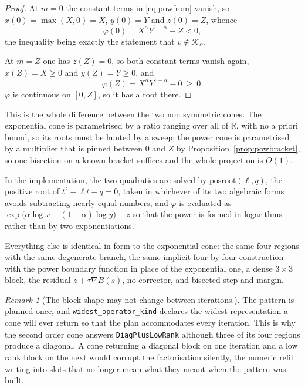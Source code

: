 \documentclass[a4paper,11pt]{book}
\theoremstyle{plain}
\theoremstyle{definition}
\theoremstyle{remark}
\newtheorem{remark}[theorem]{Remark}
\numberwithin{equation}{chapter}
\numberwithin{algorithm}{chapter}
\newcommand{\R}{\mathbb{R}}
\newcommand{\Kpow}{\mathcal{K}_{\alpha}}
\begin{document}
	\begin{proof}
		At $m=0$ the constant terms in \eqref{eq:powfrom} vanish, so
		$x(0)=\max(X,0)=X$, $y(0)=Y$ and $z(0)=Z$, whence
		\[
		\varphi(0)=X^{\alpha}Y^{1-\alpha}-Z<0 ,
		\]
		the inequality being exactly the statement that $v\notin\Kpow$.

		At $m=Z$ one has $z(Z)=0$, so both constant terms vanish again,
		$x(Z)=X\geq0$ and $y(Z)=Y\geq0$, and
		\[
		\varphi(Z)=X^{\alpha}Y^{1-\alpha}-0\ \geq\ 0 .
		\]
		$\varphi$ is continuous on $[0,Z]$, so it has a root there.
	\end{proof}

	This is the whole difference between the two non symmetric cones. The
	exponential cone is parametrised by a ratio ranging over all of $\R$, with no
	a priori bound, so its roots must be hunted by a sweep; the power cone is
	parametrised by a multiplier that is pinned between $0$ and $Z$ by
	Proposition~\ref{prop:powbracket}, so one bisection on a known bracket
	suffices and the whole projection is $O(1)$.

	In the implementation, the two quadratics are solved by
	$\mathrm{posroot}(\ell,q)$, the positive root of $t^{2}-\ell t-q=0$, taken in
	whichever of its two algebraic forms avoids subtracting nearly equal numbers,
	and $\varphi$ is evaluated as
	$\exp\bigl(\alpha\log x+(1-\alpha)\log y\bigr)-z$ so that the power is formed
	in logarithms rather than by two exponentiations.

	Everything else is identical in form to the exponential cone: the same four
	regions with the same degenerate branch, the same implicit four by four
	construction with the power boundary function in place of the exponential one,
	a dense $3\times3$ block, the residual $z+\tau\nabla B(s)$, no corrector, and
	bisected step and margin.

	\begin{remark}[The block shape may not change between iterations.]
		The pattern is planned once, and \texttt{widest\_operator\_kind} declares
		the widest representation a cone will ever return so that the plan
		accommodates every iteration. This is why the second order cone answers
		\texttt{DiagPlusLowRank} although three of its four regions produce a
		diagonal. A cone returning a diagonal block on one iteration and a low rank
		block on the next would corrupt the factorisation silently, the numeric
		refill writing into slots that no longer mean what they meant when the
		pattern was built.
	\end{remark}
\end{document}
